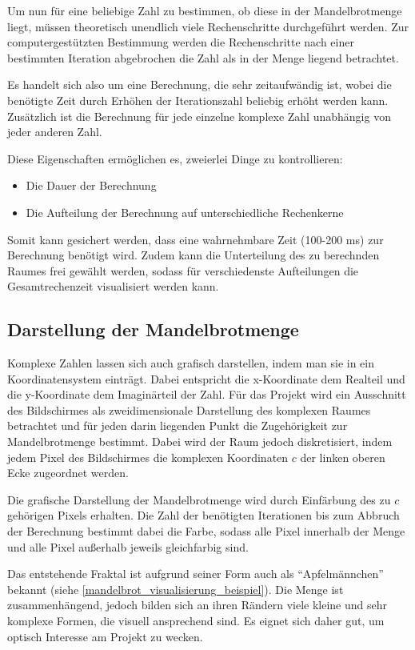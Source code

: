 Um nun für eine beliebige Zahl zu bestimmen, ob diese in der Mandelbrotmenge liegt, müssen
theoretisch unendlich viele Rechenschritte durchgeführt werden. Zur computergestützten Bestimmung
werden die Rechenschritte nach einer bestimmten Iteration abgebrochen die Zahl als in der Menge liegend betrachtet.

Es handelt sich also um eine Berechnung, die sehr zeitaufwändig ist, wobei
die benötigte Zeit durch Erhöhen der Iterationszahl beliebig erhöht werden kann.
Zusätzlich ist die Berechnung für jede einzelne komplexe Zahl unabhängig von
jeder anderen Zahl.

Diese Eigenschaften ermöglichen es, zweierlei Dinge zu kontrollieren:
\begin{itemize}
    \item Die Dauer der Berechnung
    \item Die Aufteilung der Berechnung auf unterschiedliche Rechenkerne
\end{itemize}

Somit kann gesichert werden, dass eine wahrnehmbare Zeit (100-200 ms) zur Berechnung benötigt wird.
Zudem kann die Unterteilung des zu berechnden Raumes frei gewählt werden, sodass
für verschiedenste Aufteilungen die Gesamtrechenzeit visualisiert werden kann.

\subsection{Darstellung der Mandelbrotmenge}

Komplexe Zahlen lassen sich auch grafisch darstellen, indem man sie in ein Koordinatensystem einträgt.
Dabei entspricht die x-Koordinate dem Realteil und die y-Koordinate dem Imaginärteil der Zahl.
Für das Projekt wird ein Ausschnitt des Bildschirmes als zweidimensionale Darstellung des komplexen Raumes
betrachtet und für jeden darin liegenden Punkt die Zugehörigkeit zur Mandelbrotmenge bestimmt.
Dabei wird der Raum jedoch diskretisiert, indem jedem Pixel des Bildschirmes die komplexen Koordinaten $c$
der linken oberen Ecke zugeordnet werden.

Die grafische Darstellung der Mandelbrotmenge wird durch Einfärbung des zu $c$ gehörigen Pixels erhalten.
Die Zahl der benötigten Iterationen bis zum Abbruch der Berechnung bestimmt dabei die Farbe, sodass alle Pixel
innerhalb der Menge und alle Pixel außerhalb jeweils gleichfarbig sind.

Das entstehende Fraktal ist aufgrund seiner Form auch als “Apfelmännchen” bekannt (siehe \ref{mandelbrot_visualisierung_beispiel}).
Die Menge ist zusammenhängend, jedoch bilden sich an ihren Rändern viele kleine und sehr komplexe Formen, die visuell ansprechend sind. Es eignet sich daher gut, um optisch Interesse am Projekt zu wecken.

